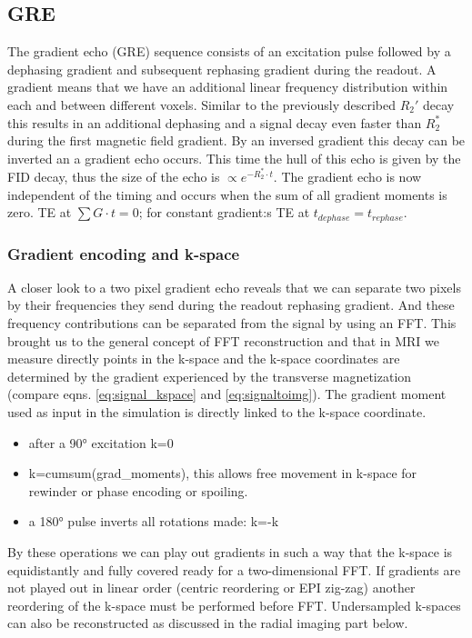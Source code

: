 \documentclass[a4paper,12pt]{extarticle}
\begin{document}
\subsection{GRE}
The gradient echo (GRE) sequence consists of an excitation pulse followed by a dephasing gradient and subsequent rephasing gradient during the readout.
A gradient means that we have an additional linear frequency distribution within each and between different voxels. Similar to the previously described $R_2'$ decay this results in an additional dephasing and a signal decay even faster than $R_2^*$ during the first magnetic field gradient. By an inversed gradient this decay can be inverted an a gradient echo occurs.
This time the hull of this echo is given by the FID decay, thus the size of the echo is $\propto e^{-R_2^*\cdot t}$.
The gradient echo is now independent of the timing and occurs when the sum of all gradient moments is zero.
TE at  $\sum G\cdot t=0$; for constant gradient:s TE at $t_{dephase}=t_{rephase}$.

\subsubsection{Gradient encoding and k-space}
A closer look to a two pixel gradient echo reveals that we can separate two pixels by their frequencies they send during the readout rephasing gradient. And these frequency contributions can be separated from the signal by using an FFT.
This brought us to the general concept of FFT reconstruction and that in MRI we measure directly points in the k-space and the k-space coordinates are determined by the gradient experienced by the transverse magnetization (compare eqns. \eqref{eq:signal_kspace} and \eqref{eq:signaltoimg}). The gradient moment used as input in the simulation is directly linked to the k-space coordinate.
\begin{itemize}
\item after a 90° excitation k=0
\item k=cumsum(grad\_moments), this allows free movement in k-space for rewinder or phase encoding or spoiling.
\item a 180° pulse inverts all rotations made: k=-k
\end{itemize}
By these operations we can play out gradients in such a way that the k-space is equidistantly and fully covered ready for a two-dimensional FFT. If gradients are not played out in linear order (centric reordering or EPI zig-zag) another reordering of the k-space must be performed before FFT. Undersampled k-spaces can also be reconstructed as discussed in the radial imaging part below.
\end{document}
